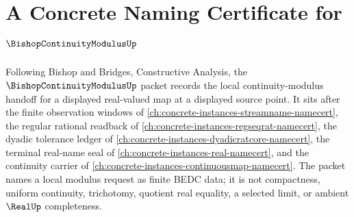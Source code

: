 \chapter{A Concrete Naming Certificate for $\BishopContinuityModulusUp$}
\label{ch:concrete-instances-bishop-continuity-modulus-namecert}

Following Bishop and Bridges, Constructive Analysis, the $\BishopContinuityModulusUp$ packet records the local continuity-modulus handoff for a displayed real-valued map at a displayed source point. It sits after the finite observation windows of \autoref{ch:concrete-instances-streamname-namecert}, the regular rational readback of \autoref{ch:concrete-instances-regseqrat-namecert}, the dyadic tolerance ledger of \autoref{ch:concrete-instances-dyadicratcore-namecert}, the terminal real-name seal of \autoref{ch:concrete-instances-real-namecert}, and the continuity carrier of \autoref{ch:concrete-instances-continuousmap-namecert}. The packet names a local modulus request as finite BEDC data; it is not compactness, uniform continuity, trichotomy, quotient real equality, a selected limit, or ambient $\RealUp$ completeness.

